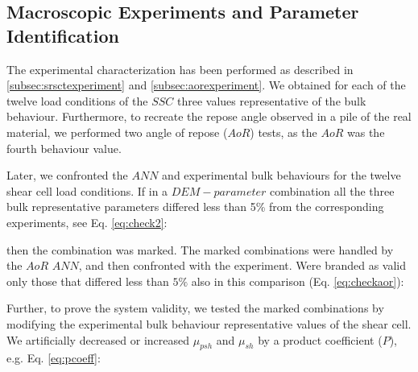 \subsection{Macroscopic Experiments and Parameter Identification}
\label{subsec:macroscopicexperimentsparameteridentification}
The experimental characterization has been performed as described in
\ref{subsec:srsctexperiment} and \ref{subsec:aorexperiment}. 
We obtained for each of the twelve load conditions of the $SSC$ three values
representative of the bulk behaviour.
Furthermore, to recreate the repose angle observed in a pile of the real material, 
we performed two angle of repose ($AoR$) tests, as the $AoR$ was the fourth
behaviour value. 

Later, we confronted the $ANN$ and experimental bulk behaviours for the twelve shear cell load conditions. 
If in a $DEM-parameter$ combination all the three bulk representative parameters differed less 
than 5\% from the corresponding experiments, see Eq. \ref{eq:check2}:

then the combination was marked. The marked combinations were handled by the
$AoR$ $ANN$, and then confronted with the experiment.
Were branded as valid only those that differed less than $5\%$ also in this
comparison (Eq. \ref{eq:checkaor}):

Further, to prove the system validity, we tested the marked combinations by
modifying the experimental bulk behaviour representative values of the shear cell. 
We artificially decreased or increased $\mu_{psh}$ and $\mu_{sh}$ by a product
coefficient ($P$), e.g. Eq. \ref{eq:pcoeff}:


